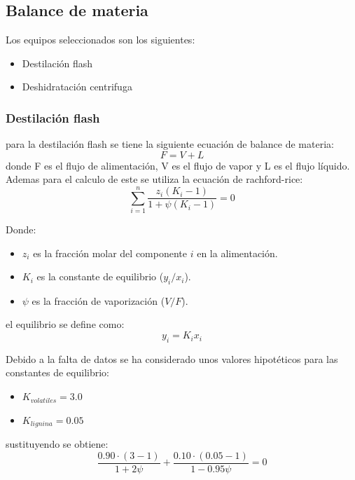 \documentclass{report}
\begin{document}
\chapter{}
\section{Balance de materia}

Los equipos seleccionados son los siguientes:
\begin{itemize}
    \item Destilación flash
    \item Deshidratación centrifuga
\end{itemize}
\subsection{Destilación flash}
para la destilación flash se tiene la siguiente ecuación de balance de materia:
\begin{equation}
F = V + L
\end{equation}
donde F es el flujo de alimentación, V es el flujo de vapor y L es el flujo líquido.\\
Ademas para el calculo de este se utiliza la ecuación de rachford-rice:
\begin{equation}
    \sum_{i=1}^{n} \frac{z_i (K_i - 1)}{1 + \psi (K_i - 1)} = 0
\end{equation}

Donde:
\begin{itemize}
    \item $z_i$ es la fracción molar del componente $i$ en la alimentación.
    \item $K_i$ es la constante de equilibrio ($y_i/x_i$).
    \item $\psi$ es la fracción de vaporización ($V/F$).
\end{itemize}
el equilibrio se define como:
\begin{equation}
y_i = K_i x_i
\end{equation}

\noindent Debido a la falta de datos se ha considerado unos valores hipotéticos para las constantes de equilibrio:
\begin{itemize}
    \item $K_{volatiles} = 3.0$
    \item $K_{lignina} = 0.05$
\end{itemize}
\vspace{1em}
\solve{}
sustituyendo se obtiene:
\begin{equation}
\frac{0.90\cdot(3 - 1)}{1 + 2\psi}
+
\frac{0.10\cdot(0.05 - 1)}{1 - 0.95\psi}
= 0
\end{equation}
\end{document}
